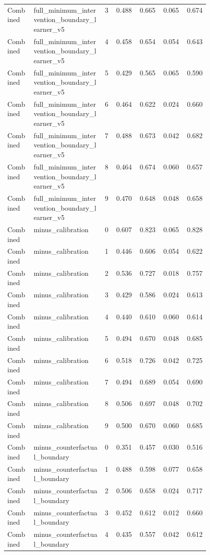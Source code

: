 \documentclass{article}
\begin{document}
\begin{center}
\begin{longtable}{p{0.13\linewidth}p{0.35\linewidth}rrrrr}
Combined & full\_minimum\_intervention\_boundary\_learner\_v5 & 3 & 0.488 & 0.665 & 0.065 & 0.674\\
Combined & full\_minimum\_intervention\_boundary\_learner\_v5 & 4 & 0.458 & 0.654 & 0.054 & 0.643\\
Combined & full\_minimum\_intervention\_boundary\_learner\_v5 & 5 & 0.429 & 0.565 & 0.065 & 0.590\\
Combined & full\_minimum\_intervention\_boundary\_learner\_v5 & 6 & 0.464 & 0.622 & 0.024 & 0.660\\
Combined & full\_minimum\_intervention\_boundary\_learner\_v5 & 7 & 0.488 & 0.673 & 0.042 & 0.682\\
Combined & full\_minimum\_intervention\_boundary\_learner\_v5 & 8 & 0.464 & 0.674 & 0.060 & 0.657\\
Combined & full\_minimum\_intervention\_boundary\_learner\_v5 & 9 & 0.470 & 0.648 & 0.048 & 0.658\\
Combined & minus\_calibration & 0 & 0.607 & 0.823 & 0.065 & 0.828\\
Combined & minus\_calibration & 1 & 0.446 & 0.606 & 0.054 & 0.622\\
Combined & minus\_calibration & 2 & 0.536 & 0.727 & 0.018 & 0.757\\
Combined & minus\_calibration & 3 & 0.429 & 0.586 & 0.024 & 0.613\\
Combined & minus\_calibration & 4 & 0.440 & 0.610 & 0.060 & 0.614\\
Combined & minus\_calibration & 5 & 0.494 & 0.670 & 0.048 & 0.685\\
Combined & minus\_calibration & 6 & 0.518 & 0.726 & 0.042 & 0.725\\
Combined & minus\_calibration & 7 & 0.494 & 0.689 & 0.054 & 0.690\\
Combined & minus\_calibration & 8 & 0.506 & 0.697 & 0.048 & 0.702\\
Combined & minus\_calibration & 9 & 0.500 & 0.670 & 0.060 & 0.685\\
Combined & minus\_counterfactual\_boundary & 0 & 0.351 & 0.457 & 0.030 & 0.516\\
Combined & minus\_counterfactual\_boundary & 1 & 0.488 & 0.598 & 0.077 & 0.658\\
Combined & minus\_counterfactual\_boundary & 2 & 0.506 & 0.658 & 0.024 & 0.717\\
Combined & minus\_counterfactual\_boundary & 3 & 0.452 & 0.612 & 0.012 & 0.660\\
Combined & minus\_counterfactual\_boundary & 4 & 0.435 & 0.557 & 0.042 & 0.612\\

\end{longtable}
\end{center}
\end{document}
